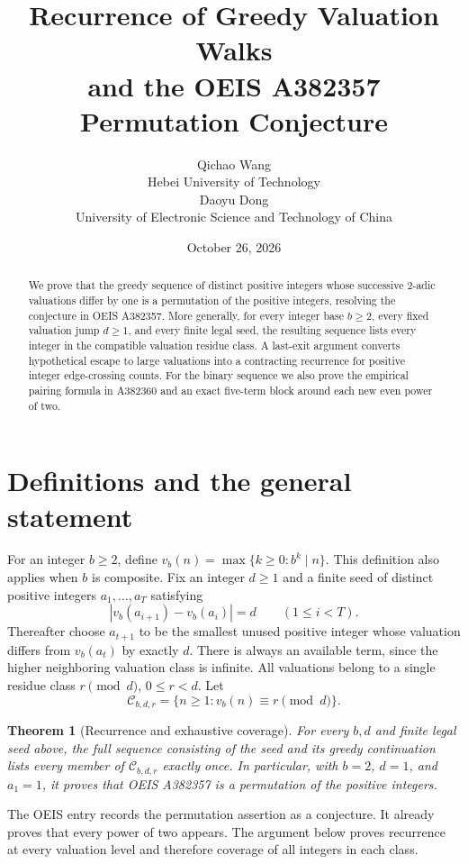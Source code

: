 \documentclass[10pt]{article}
\title{Recurrence of Greedy Valuation Walks\\and the OEIS A382357 Permutation Conjecture}
\author{Qichao Wang\\{\small Hebei University of Technology}\\[0.3em]
Daoyu Dong\\{\small University of Electronic Science and Technology of China}}
\date{October 26, 2026}
\newtheorem{theorem}{Theorem}
\begin{document}
\maketitle
\begin{abstract}
We prove that the greedy sequence of distinct positive integers whose
successive $2$-adic valuations differ by one is a permutation of the
positive integers, resolving the conjecture in OEIS A382357. More
generally, for every integer base $b\ge2$, every fixed valuation jump
$d\ge1$, and every finite legal seed, the resulting sequence lists
every integer in the compatible valuation residue class. A last-exit
argument converts hypothetical escape to large valuations into a
contracting recurrence for positive integer edge-crossing counts.
For the binary sequence we also prove the empirical pairing formula
in A382360 and an exact five-term block around each new even power of two.
\end{abstract}

\section{Definitions and the general statement}
For an integer $b\ge2$, define $v_b(n)=\max\{k\ge0:b^k\mid n\}$.
This definition also applies when $b$ is composite. Fix an integer
$d\ge1$ and a finite seed of distinct positive integers
$a_1,\ldots,a_T$ satisfying
\[
 |v_b(a_{i+1})-v_b(a_i)|=d\qquad(1\le i<T).
\]
Thereafter choose $a_{t+1}$ to be the smallest unused positive integer
whose valuation differs from $v_b(a_t)$ by exactly $d$. There is always
an available term, since the higher neighboring valuation class is infinite.
All valuations belong to a single residue class $r\pmod d$, $0\le r<d$.
Let
\[
 \mathcal C_{b,d,r}=\{n\ge1:v_b(n)\equiv r\pmod d\}.
\]

\begin{theorem}[Recurrence and exhaustive coverage]\label{thm:main}
For every $b,d$ and finite legal seed above, the full sequence consisting
of the seed and its greedy continuation lists every member of
$\mathcal C_{b,d,r}$ exactly once.
In particular, with $b=2$, $d=1$, and $a_1=1$, it proves that OEIS
A382357 is a permutation of the positive integers.
\end{theorem}

The OEIS entry \cite{a382357} records the permutation assertion as a
conjecture. It already proves that every power of two appears. The
argument below proves recurrence at every valuation level and therefore
coverage of all integers in each class.
\end{document}
